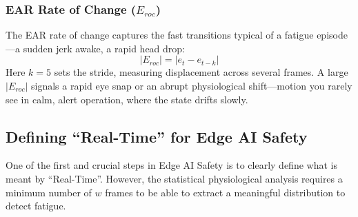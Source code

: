 \subsubsection{EAR Rate of Change ($E_{roc}$)}
The EAR rate of change captures the fast transitions typical of a fatigue episode---a sudden jerk awake, a rapid head drop:
\begin{equation}
    |E_{roc}| = |e_t - e_{t-k}|
\end{equation}
Here $k = 5$ sets the stride, measuring displacement across several frames. A large $|E_{roc}|$ signals a rapid eye snap or an abrupt physiological shift---motion you rarely see in calm, alert operation, where the state drifts slowly.

\begin{table}[htbp]
\centering
\caption{Sensitivity analysis of the features. \textit{Each feature maps to a particular type of anomaly. Mean EAR supplies physiological background, while kurtosis and skewness pick up the non-Gaussian behaviour that characterizes the onset of fatigue.}}
\label{tab:feature_sensitivity}
\end{table}

\subsection{Defining ``Real-Time'' for Edge AI Safety}
One of the first and crucial steps in Edge AI Safety is to clearly define what is meant by ``Real-Time''. However, the statistical physiological analysis requires a minimum number of $w$ frames to be able to extract a meaningful distribution to detect fatigue.

